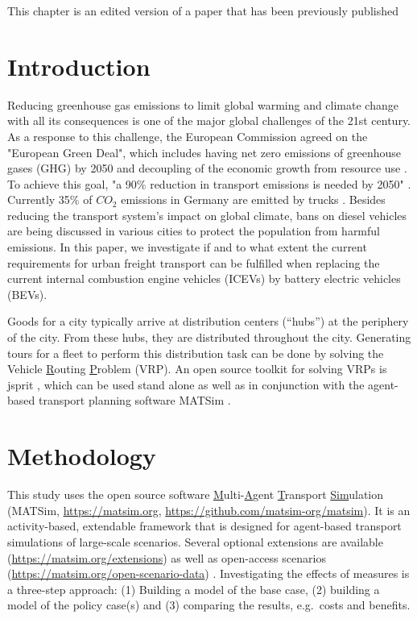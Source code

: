 

This chapter is an edited version of a paper that has been previously published \citet{MartinsturnerEtAl2020ETrucksFoodABMTrans}

\section{Introduction}
\label{sec:el-ersetzung-introduction}
Reducing greenhouse gas emissions to limit global warming and climate change with all its consequences is one of the major global challenges of the 21st century. 
As a response to this challenge, the European Commission agreed on the "European Green Deal", which includes having net zero emissions of greenhouse gases (GHG) by 2050 and decoupling of the economic growth from resource use \cite{EuropKomm2019EUGreenDeal}. 
To achieve this goal, "a 90\% reduction in transport emissions is needed by 2050" \cite{EuropKomm2019EUGreenDeal}.
Currently 35\% of $CO_2$ emissions in Germany are emitted by trucks \cite{BMU2018KlimaschutzZahlen}. 
Besides reducing the transport system's impact on global climate, bans on diesel vehicles are being discussed in various cities to protect the population from harmful emissions\cite{SenStadt2013Luftreinhalteplan, wikiDieselfahrverbot}.
In this paper, we investigate if and to what extent the current requirements for urban freight transport can be fulfilled when replacing the current internal combustion engine vehicles (ICEVs) by battery electric vehicles (BEVs). 

Goods for a city typically arrive at distribution centers (``hubs'') at the periphery of the city. From these hubs, they are distributed throughout the city. 
Generating tours for a fleet to perform this distribution task can be done by solving the {V}ehicle \underline{R}outing \underline{P}roblem (VRP). 
An open source toolkit for solving VRPs is jsprit \cite{JspritGithub2018}, which can be used stand alone as well as in conjunction with the agent-based transport planning software MATSim \cite{ZilskeJoubert2015FreightTrafficInBook}.


\section{Methodology}
\label{sec:methodology}
This study uses the open source software \underline{M}ulti-\underline{A}gent \underline{T}ransport \underline{Sim}ulation (MATSim, \url{https://matsim.org}, \url{https://github.com/matsim-org/matsim}).
It is an activity-based, extendable framework that is designed for agent-based transport simulations of large-scale scenarios. 
Several optional extensions are available (\url{https://matsim.org/extensions}) as well as open-access scenarios (\url{https://matsim.org/open-scenario-data}) \cite{MATSimBook}.
%
Investigating the effects of measures is a three-step approach: (1)  Building a model of the base case, (2) building a model of the policy case(s) and (3) comparing the results, e.g.\ costs and benefits.

